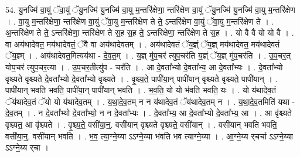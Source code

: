 \documentclass[17pt]{extarticle}
\begin{document}
54. यु॒नज्मि॑ वा॒युं ॅवा॒युं ॅयु॒नज्मि॑ यु॒नज्मि॑ वा॒यु म॒न्तरि॑क्षेणा॒ न्तरि॑क्षेण वा॒युं ॅयु॒नज्मि॑ यु॒नज्मि॑ वा॒यु म॒न्तरि॑क्षेण । . वा॒यु म॒न्तरि॑क्षेणा॒ न्तरि॑क्षेण वा॒युं ॅवा॒यु म॒न्तरि॑क्षेण ते ते॒ ऽन्तरि॑क्षेण वा॒युं ॅवा॒यु म॒न्तरि॑क्षेण ते । . अ॒न्तरि॑क्षेण ते ते॒ ऽन्तरि॑क्षेणा॒ न्तरि॑क्षेण ते स॒ह स॒ह ते॒ ऽन्तरि॑क्षेणा॒ न्तरि॑क्षेण ते स॒ह । . यो वै वै यो यो वै । . वा अय॑थादेवत॒ मय॑थादेवतं॒ ॅवै वा अय॑थादेवतम् । . अय॑थादेवतं ॅय॒ज्ञ्ं ॅय॒ज्ञ् मय॑थादेवत॒ मय॑थादेवतं ॅय॒ज्ञ्म् । . अय॑थादेवत॒मित्यय॑था - दे॒व॒त॒म् । . य॒ज्ञ् मु॑प॒चर॑ त्युप॒चर॑ति य॒ज्ञ्ं ॅय॒ज्ञ् मु॑प॒चर॑ति । . उ॒प॒चर॒त् योप॒चर॑ त्युप॒चर॒त्या । . उ॒प॒चर॒तीत्यु॑प - चर॑ति । . आ दे॒वता᳚भ्यो दे॒वता᳚भ्य॒ आ दे॒वता᳚भ्यः । . दे॒वता᳚भ्यो वृश्च्यते वृश्च्यते दे॒वता᳚भ्यो दे॒वता᳚भ्यो वृश्च्यते । . वृ॒श्च्य॒ते॒ पापी॑या॒न् पापी॑यान् वृश्च्यते वृश्च्यते॒ पापी॑यान् । . पापी॑यान् भवति भवति॒ पापी॑या॒न् पापी॑यान् भवति । . भ॒व॒ति॒ यो यो भ॑वति भवति॒ यः । . यो य॑थादेव॒तं ॅय॑थादेव॒तं ॅयो यो य॑थादेव॒तम् । . य॒था॒दे॒व॒तम् न न य॑थादेव॒तं ॅय॑थादेव॒तम् न । . य॒था॒दे॒व॒तमिति॑ यथा - दे॒व॒तम् । . न दे॒वता᳚भ्यो दे॒वता᳚भ्यो॒ न न दे॒वता᳚भ्यः । . दे॒वता᳚भ्य॒ आ दे॒वता᳚भ्यो दे॒वता᳚भ्य॒ आ । . आ वृ॑श्च्यते वृश्च्यत॒ आ वृ॑श्च्यते । . वृ॒श्च्य॒ते॒ वसी॑या॒न्॒. वसी॑यान् वृश्च्यते वृश्च्यते॒ वसी॑यान् । . वसी॑यान् भवति भवति॒ वसी॑या॒न्॒. वसी॑यान् भवति । . भ॒व॒ त्या॒ग्ने॒य्या ऽऽग्ने॒य्या भ॑वति भव त्याग्ने॒य्या । . आ॒ग्ने॒य्य र्‌चर्चा ऽऽग्ने॒य्या ऽऽग्ने॒य्य र्‌चा । \newline
\end{document}
